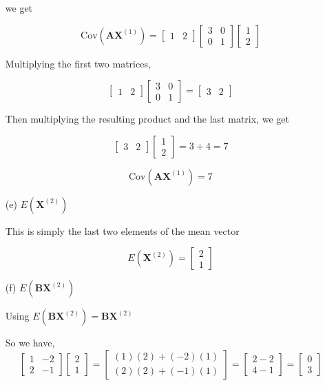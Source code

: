 \documentclass[12pt]{article}
\begin{document}
\begin{enumerate}
we get

$$
\text{Cov}(\mathbf{AX}^{(1)}) = \begin{bmatrix} 1 & 2 \end{bmatrix} \begin{bmatrix} 3 & 0 \\ 0 & 1 \end{bmatrix} \begin{bmatrix} 1 \\ 2 \end{bmatrix}
$$

Multiplying the first two matrices,

$$
\begin{bmatrix} 1 & 2 \end{bmatrix} \begin{bmatrix} 3 & 0 \\ 0 & 1 \end{bmatrix}  = \begin{bmatrix} 3 & 2
\end{bmatrix}
$$

Then multiplying the resulting product and the last matrix, we get

$$
\begin{bmatrix} 3 & 2 \end{bmatrix} \begin{bmatrix} 1 \\ 2 \end{bmatrix} = 3 + 4 =7
$$

$$
\boxed{
\text{Cov}(\mathbf{A}\mathbf{X}^{(1)}) = 7
}
$$

\item[(e)] $E(\mathbf{X}^{(2)})$

\noindent This is simply the last two elements of the mean vector

$$
\boxed{
E(\mathbf{X}^{(2)}) = \begin{bmatrix} 2 \\ 1 \end{bmatrix}
}
$$

\item[(f)] $E(\mathbf{B}\mathbf{X}^{(2)})$

\vspace{0.5em}

\noindent Using $E(\mathbf{B}\mathbf{X}^{(2)}) = \mathbf{B}\mathbf{X}^{(2)}$

So we have,
$$
\begin{bmatrix} 1 & -2 \\ 2 & -1 \end{bmatrix}
\begin{bmatrix} 2 \\ 1 \end{bmatrix}
=
\begin{bmatrix} (1)(2)+(-2)(1) \\ (2)(2)+(-1)(1) \end{bmatrix}
=
\begin{bmatrix} 2-2 \\ 4-1 \end{bmatrix} = \begin{bmatrix} 0 \\ 3 \end{bmatrix}
$$


\end{enumerate}
\end{document}
